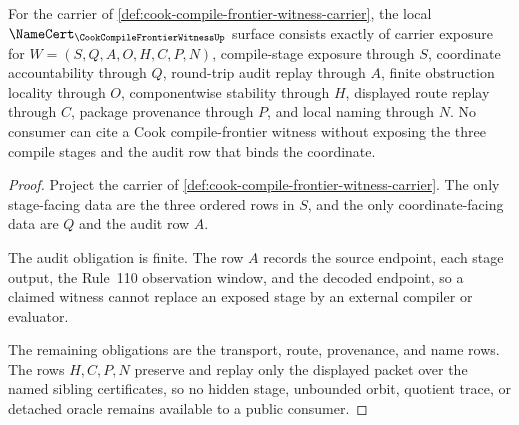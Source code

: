 \begin{theorem}
\label{thm:cook-compile-frontier-witness-obligation-surface}
For the carrier of \autoref{def:cook-compile-frontier-witness-carrier}, the local $\NameCert_{\CookCompileFrontierWitnessUp}$ surface consists exactly of carrier exposure for $W=(S,Q,A,O,H,C,P,N)$, compile-stage exposure through $S$, coordinate accountability through $Q$, round-trip audit replay through $A$, finite obstruction locality through $O$, componentwise stability through $H$, displayed route replay through $C$, package provenance through $P$, and local naming through $N$. No consumer can cite a Cook compile-frontier witness without exposing the three compile stages and the audit row that binds the coordinate.
\end{theorem}
\begin{proof}
Project the carrier of \autoref{def:cook-compile-frontier-witness-carrier}. The only stage-facing data are the three ordered rows in $S$, and the only coordinate-facing data are $Q$ and the audit row $A$.

The audit obligation is finite. The row $A$ records the source endpoint, each stage output, the Rule~110 observation window, and the decoded endpoint, so a claimed witness cannot replace an exposed stage by an external compiler or evaluator.

The remaining obligations are the transport, route, provenance, and name rows. The rows $H,C,P,N$ preserve and replay only the displayed packet over the named sibling certificates, so no hidden stage, unbounded orbit, quotient trace, or detached oracle remains available to a public consumer.
\end{proof}

